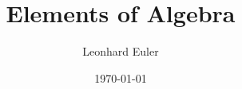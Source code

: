 \documentclass{ctexbook} %
\begin{document}

\title{Elements of Algebra}
\author{Leonhard Euler}
\date{\today}
\maketitle

\tableofcontents

\end{document}
